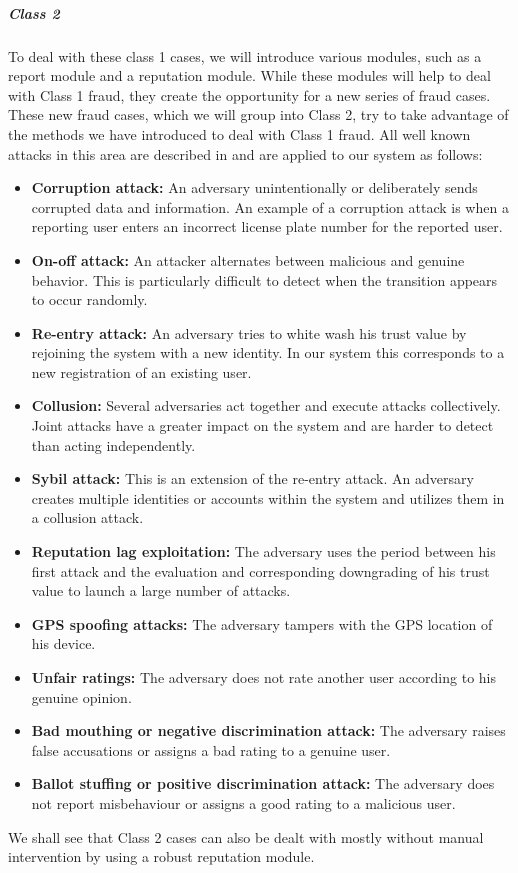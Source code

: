 \documentclass[
a4paper,     %
titlepage,   %
14pt         %
]{scrartcl}  %
\theoremstyle{mystyle}
\begin{document}
\subparagraph{Class 2} To deal with these class 1 cases, we will introduce various modules, such as a report module and a reputation module. While these modules will help to deal with Class 1 fraud, they create the opportunity for a new series of fraud cases. These new fraud cases, which we will group into Class 2, try to take advantage of the methods we have introduced to deal with Class 1 fraud. All well known attacks in this area are described in \cite{mousa2015trust} and are applied to our system as follows:
\begin{itemize}
\item \textbf{Corruption attack:} An adversary unintentionally or deliberately sends corrupted data and information. An example of a corruption attack is when a reporting user enters an incorrect license plate number for the reported user.
\item \textbf{On-off attack:} An attacker alternates between malicious and genuine behavior. This is particularly difficult to detect when the transition appears to occur randomly.
\item \textbf{Re-entry attack:} An adversary tries to white wash his trust value by rejoining the system with a new identity. In our system this corresponds to a new registration of an existing user.
\item \textbf{Collusion:} Several adversaries act together and execute attacks collectively. Joint attacks have a greater impact on the system and are harder to detect than acting independently.
\item \textbf{Sybil attack:} This is an extension of the re-entry attack. An adversary creates multiple identities or accounts within the system and utilizes them in a collusion attack.
\item \textbf{Reputation lag exploitation:} The adversary uses the period between his first attack and the evaluation and corresponding downgrading of his trust value to launch a large number of attacks.
\item \textbf{GPS spoofing attacks:} The adversary tampers with the GPS location of his device.
\item \textbf{Unfair ratings:} The adversary does not rate another user according to his genuine opinion.
\item \textbf{Bad mouthing or negative discrimination attack:} The adversary raises false accusations or assigns a bad rating to a genuine user.
\item \textbf{Ballot stuffing or positive discrimination attack:} The adversary does not report misbehaviour or assigns a good rating to a malicious user.
\end{itemize}
We shall see that Class 2 cases can also be dealt with mostly without manual intervention by using a robust reputation module. 
\end{document}
